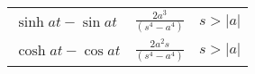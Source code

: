 \documentclass[a4paper]{article}
\begin{document}
\begin{center}
\begin{tabular}{llcccc}
		\multicolumn{2}{l}{$\displaystyle \sinh at - \sin at $} & \multicolumn{2}{c}{$\displaystyle \frac{2a^3}{(s^4 - a^4) }$} & \multicolumn{2}{c}{$s > |a|$} \\


\multicolumn{2}{l}{$\displaystyle \cosh at - \cos at $} & \multicolumn{2}{c}{$\displaystyle \frac{2a^{2}s}{(s^4 - a^4) }$} & \multicolumn{2}{c}{$s > |a|$} \\



	\end{tabular}
	
\end{center}
\end{document}
